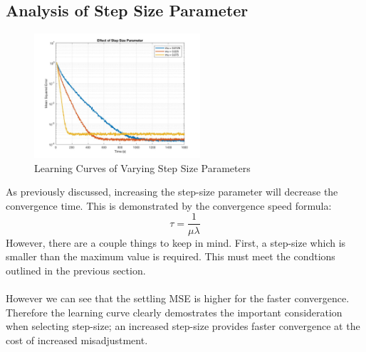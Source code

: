 \documentclass[journal]{IEEEtran}
\begin{document}
\subsection{Analysis of Step Size Parameter}
\vspace{-5mm}
\begin{figure}[H]
  \centering
  \captionsetup{justification=centering,font = small}
  \includegraphics[width=0.55\textwidth, inner] {Plots/Project1_Part4.jpg}
  \caption{Learning Curves of Varying Step Size Parameters}
    \label{fig:stepsize}
\end{figure}
As previously discussed, increasing the step-size parameter will decrease the
convergence time. This is demonstrated by the convergence speed formula:
$$ \tau = \dfrac{1}{\mu\lambda}$$ However, there are a couple things to keep in mind. First, a
step-size which is smaller than the maximum value is required. This must meet the condtions outlined in the previous section.
\\
\\
However we can see that the settling MSE is higher for the faster convergence. Therefore the learning curve
clearly demostrates the important consideration when selecting step-size; an increased step-size provides
faster convergence at the cost of increased misadjustment.
\end{document}
